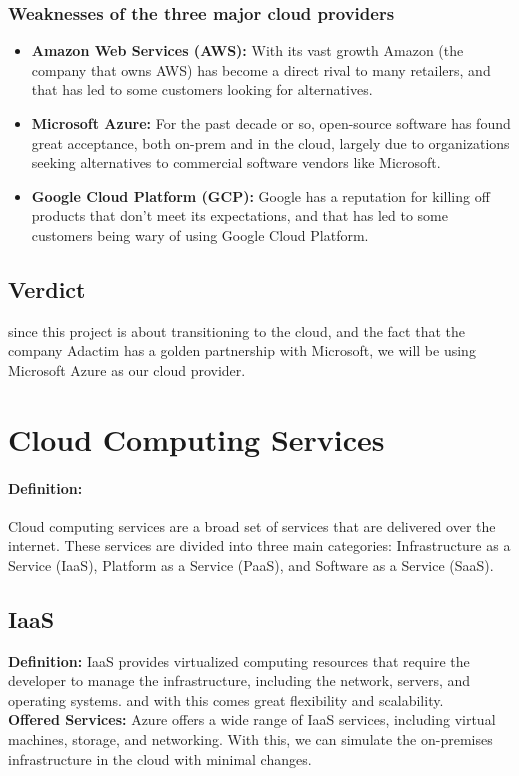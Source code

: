 \subsubsection*{Weaknesses of the three major cloud providers \cite{webArticle1}}
\begin{itemize}
    \item \textbf{Amazon Web Services (AWS):} With its vast growth Amazon (the company that owns AWS) has become a direct rival to many retailers, and that has led to some customers looking for alternatives.
    \item \textbf{Microsoft Azure:} For the past decade or so, open-source software has found great acceptance, both on-prem and in the cloud, largely due to organizations seeking alternatives to commercial software vendors like Microsoft.
    \item \textbf{Google Cloud Platform (GCP):} Google has a reputation for killing off products that don't meet its expectations, and that has led to some customers being wary of using Google Cloud Platform.
\end{itemize}
\subsection*{Verdict}
since this project is about transitioning to the cloud, and the fact that the company Adactim has a golden partnership with Microsoft, we will be using Microsoft Azure as our cloud provider.


\section{Cloud Computing Services}
\paragraph*{Definition:} Cloud computing services are a broad set of services that are delivered over the internet. These services are divided into three main categories: Infrastructure as a Service (IaaS), Platform as a Service (PaaS), and Software as a Service (SaaS).
\subsection*{IaaS}
\noindent
\textbf{Definition:} IaaS provides virtualized computing resources that require the developer to manage the infrastructure, including the network, servers, and operating systems. and with this comes great flexibility and scalability.
\noindent \\
\textbf{Offered Services:} Azure offers a wide range of IaaS services, including virtual machines, storage, and networking. With this, we can simulate the on-premises infrastructure in the cloud with minimal changes.
